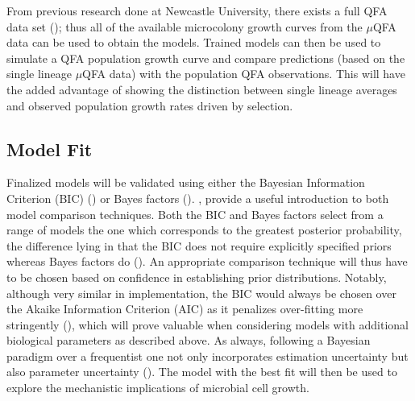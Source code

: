 \documentclass{bioinfo}
\begin{document}
From previous research done at Newcastle University, there exists a full QFA data set (\citealp{Addinall11}); thus all of the available microcolony growth curves from the $\mu$QFA data can be used to obtain the models. Trained models can then be used to simulate a QFA population growth curve and compare  predictions (based on the single lineage $\mu$QFA data) with the population QFA observations. This will have the added advantage of showing the distinction between single lineage averages and observed population growth rates driven by selection. 

\vspace{-1em}
\subsection{Model Fit}

Finalized models will be validated using either the Bayesian Information Criterion (BIC) (\citealp{Schwarz78}) or Bayes factors (\citealp{Kass95}). \citealp{Christensen11}, provide a useful introduction to both model comparison techniques. Both the BIC and Bayes factors select from a range of models the one which corresponds to the greatest posterior probability, the difference lying in that the BIC does not require explicitly specified priors whereas Bayes factors do (\citealp{Bollen12}). An appropriate comparison technique will thus have to be chosen based on confidence in establishing prior distributions. Notably, although very similar in implementation, the BIC would always be chosen over the Akaike Information Criterion (AIC) as it penalizes over-fitting more stringently (\citealp{Burnham02}), which will prove valuable when considering models with additional biological parameters as described above. As always, following a Bayesian paradigm over a frequentist one not only incorporates estimation uncertainty but also parameter uncertainty (\citealp{Christensen11}). The model with the best fit will then be used to explore the mechanistic implications of microbial cell growth. 

\end{document}
